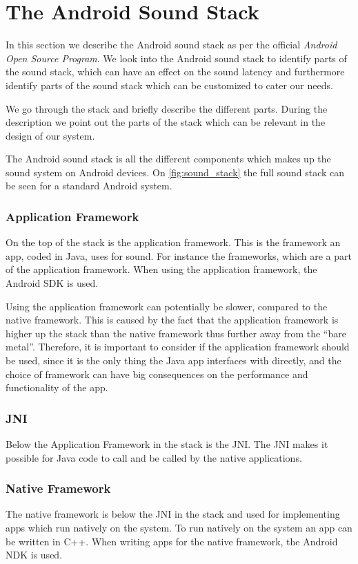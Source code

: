 \section{The Android Sound Stack}\label{sec:androidaudiostack}
In this section we describe the Android sound stack as per the official \textit{Android Open Source Program}\cite{sound_stack}.
We look into the Android sound stack to identify parts of the sound stack,
which can have an effect on the sound latency and furthermore identify parts of the sound stack which can be customized to cater our needs.

We go through the stack and briefly describe the different parts.
During the description we point out the parts of the stack which can be relevant in the design of our system.

The Android sound stack is all the different components which makes up the sound system on Android devices.
On \cref{fig:sound_stack} the full sound stack can be seen for a standard Android system.

\subsubsection*{Application Framework}
On the top of the stack is the application framework.
This is the framework an app, coded in Java, uses for sound.
For instance the  frameworks, which are a part of the application framework.
When using the application framework, the Android \ac{SDK} is used.

Using the application framework can potentially be slower, compared to the native framework.
This is caused by the fact that the application framework is higher up the stack than the native framework thus further away from the ``bare metal''.
Therefore, it is important to consider if the application framework should be used,
since it is the only thing the Java app interfaces with directly,
and the choice of framework can have big consequences on the performance and functionality of the app.

\subsubsection*{JNI}
Below the Application Framework in the stack is the \ac{JNI}.
The \ac{JNI} makes it possible for Java code to call and be called by the native applications\cite{jni}.

\subsubsection*{Native Framework}
The native framework is below the \ac{JNI} in the stack and used for implementing apps which run natively on the system.
To run natively on the system an app can be written in C++.
When writing apps for the native framework, the Android \ac{NDK} is used.

